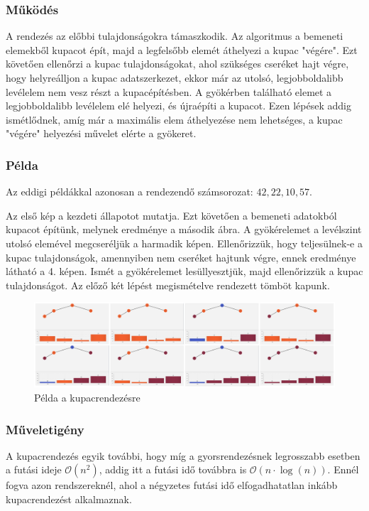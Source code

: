 \documentclass{elteikthesis}
\begin{document}
\subsubsection{Működés}
A rendezés az előbbi tulajdonságokra támaszkodik. 
Az algoritmus a bemeneti elemekből kupacot épít, majd a legfelsőbb elemét áthelyezi a kupac "végére". Ezt követően ellenőrzi a kupac tulajdonságokat, ahol szükséges cseréket hajt végre, hogy helyreálljon a kupac adatszerkezet, ekkor már az utolsó, legjobboldalibb levélelem nem vesz részt a kupacépítésben. A gyökérben található elemet a legjobboldalibb levélelem elé helyezi, és újraépíti a kupacot. Ezen lépések addig ismétlődnek, amíg már a maximális elem áthelyezése nem lehetséges, a kupac "végére" helyezési művelet elérte a gyökeret.\par
 \subsubsection{Példa}
 Az eddigi példákkal azonosan a rendezendő számsorozat: $42, 22, 10, 57$.\par
 Az első kép a kezdeti állapotot mutatja. Ezt követően a bemeneti adatokból kupacot építünk, melynek eredménye a második ábra. A gyökérelemet a levélszint utolsó elemével megcseréljük a harmadik képen. Ellenőrizzük, hogy teljesülnek-e a kupac tulajdonságok, amennyiben nem cseréket hajtunk végre, ennek eredménye látható a 4. képen. Ismét a gyökérelemet lesüllyesztjük, majd ellenőrizzük a kupac tulajdonságot. Az előző két lépést megismételve rendezett tömböt kapunk.\par
 \begin{figure}[H]
 	\centering
 	\includegraphics[width=1\textwidth]{pics/heap.jpg}
 	\caption{Példa a kupacrendezésre}
 \end{figure}\par
\subsubsection{Műveletigény}
A kupacrendezés egyik további, hogy míg a gyorsrendezésnek legrosszabb esetben a futási ideje $\mathcal{O}(n^2)$, addig itt a futási idő továbbra is $\mathcal{O}(n\cdot\log (n))$. Ennél fogva azon rendszereknél, ahol a négyzetes futási idő elfogadhatatlan inkább kupacrendezést alkalmaznak.
\end{document}
